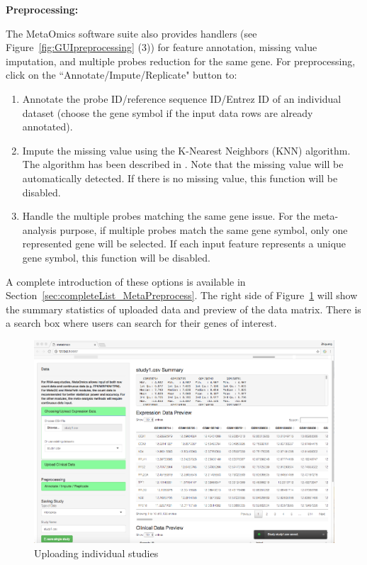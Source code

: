 \begin{steps}
\item \textbf{Preprocessing:}

The MetaOmics software suite also provides handlers (see Figure~\ref{fig:GUIpreprocessing} {\color{red} (3)}) for feature annotation, 
missing value imputation, and multiple probes reduction for the same gene.
For preprocessing, 
click on the ``Annotate/Impute/Replicate" button to:
\begin{enumerate}
\item Annotate the probe ID/reference sequence ID/Entrez ID of an individual dataset (choose the gene symbol if the input data rows are already annotated).
\item Impute the missing value using the K-Nearest Neighbors (KNN) algorithm.
The algorithm has been described in \cite{troyanskaya2001missing}.
Note that the missing value will be automatically detected. 
If there is no missing value, this function will be disabled.

\item Handle the multiple probes matching the same gene issue.
For the meta-analysis purpose, 
if multiple probes match  the same gene symbol, only one represented gene will be selected.
If each input feature represents a unique gene symbol, this function will be disabled.

\end{enumerate}

A complete introduction of these options is available in Section~\ref{sec:completeList_MetaPreprocess}.
The right side of Figure~\ref{fig:GUIpreview} will show the summary statistics of uploaded data and preview of the data matrix.
There is a search box where users can search for their genes of interest.

\begin{figure}[H]
\begin{center}
\includegraphics[scale=1]{./figure/preprocessing/GUIpreview}
\caption{Uploading individual studies}
\label{fig:GUIpreview}
\end{center}
\end{figure}


\end{steps}
